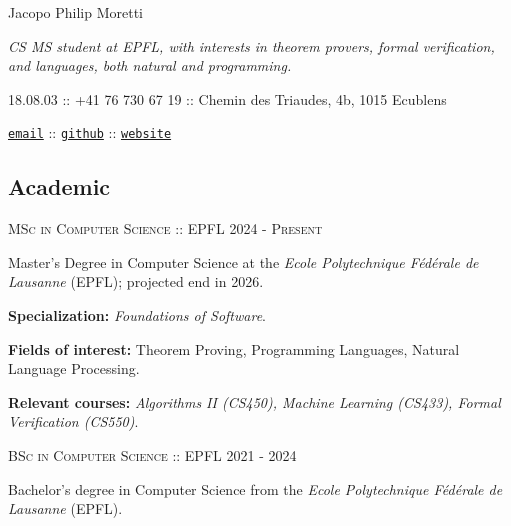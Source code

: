 \documentclass[11pt]{article}
\renewcommand{\url}[1]{{\texttt{#1}}}
\renewcommand{\line}[2]{{\vspace{4pt} \large \noindent\textsc{#1} \hfill \small{#2}}\vspace{0pt}}
\newif\ifisleft
\begin{document}
  \setlength{\parindent}{0em}
  \pagestyle{empty}

  \begin{center}
  \noindent\begin{minipage}{0.66\textwidth}
    \begin{center}
      \huge Jacopo Philip Moretti
    \end{center}
    \textit{CS MS student at EPFL, with interests in theorem provers, formal verification, and languages, both natural and programming.}

    18.08.03 :: +41 76 730 67 19 :: Chemin des Triaudes, 4b, 1015 Ecublens
    \begin{center}
      \href{https://people.epfl.ch/jacopo.moretti}{\url{email}} :: \href{https://github.com/quartztz}{\url{github}} :: \href{https://quartztz.github.io}{\url{website}}
    \end{center}
  \end{minipage}
  \ifisleft
    \begin{minipage}{0.25\textwidth}
      \begin{center}
        \texttt{[image: example-image-a]}
      \end{center}
    \end{minipage}
  \fi
  \end{center}

  \subsection*{Academic}

  \line{MSc in Computer Science :: EPFL}{2024 - \textsc{Present}}

  Master's Degree in Computer Science at the \textit{Ecole Polytechnique Fédérale de Lausanne} (EPFL); projected end in 2026.

  \textbf{Specialization:} \textit{Foundations of Software}.

  \textbf{Fields of interest:} Theorem Proving, Programming Languages, Natural Language Processing.

  \textbf{Relevant courses:} \textit{Algorithms II (CS450), Machine Learning (CS433), Formal Verification (CS550)}.

  \vspace{0.75em}
  \line{BSc in Computer Science :: EPFL}{2021 - 2024}

  Bachelor's degree in Computer Science from the \textit{Ecole Polytechnique Fédérale de Lausanne} (EPFL).
\end{document}
